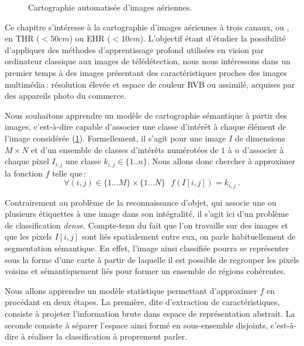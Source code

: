 \begin{figure}[t]
	\resizebox{\textwidth}{!}{}
	\caption{Cartographie automatisée d'images aériennes.}
	\label{fig:semantic_mapping}
\end{figure}

Ce chapitre s'intéresse à la cartographie d'images aériennes à trois canaux,  ou , en \gls{THR} ($<50cm$) ou \gls{EHR} ($<10cm$). L'objectif étant d'étudier la possibilité d'appliquer des méthodes d'apprentissage profond utilisées en vision par ordinateur classique aux images de télédétection, nous nous intéressons dans un premier temps à des images présentant des caractéristiques proches des images multimédia\,: résolution élevée et espace de couleur \gls{RVB} ou assimilé, acquises par des appareils photo du commerce.

Nous souhaitons apprendre un modèle de cartographie sémantique à partir des images, c'est-à-dire capable d'associer une classe d'intérêt à chaque élément de l'image considérée (\cref{fig:semantic_mapping}). Formellement, il s'agit pour une image $I$ de dimensions $M \times N$ et d'un ensemble de classes d'intérêts numérotées de $1$ à $n$ d'associer à chaque pixel $I_{i,j}$ une classe $k_{i,j} \in \{1..n\}$. Nous allons donc chercher à approximer la fonction $f$ telle que\,:
\begin{equation}
	\forall (i,j) \in \{1\dots{}M\}\times\{1\dots{}N\}~~~f(I[i,j]) = k_{i,j}~.
\end{equation}

Contrairement au problème de la reconnaissance d'objet, qui associe une ou plusieurs étiquettes à une image dans son intégralité, il s'agit ici d'un problème de classification \emph{dense}. Compte-tenu du fait que l'on travaille sur des images et que les pixels $I[i,j]$ sont liés spatialement entre eux, on parle habituellement de segmentation sémantique. En effet, l'image ainsi classifiée pourra se représenter sous la forme d'une carte à partir de laquelle il est possible de regrouper les pixels voisins et sémantiquement liés pour former un ensemble de régions cohérentes.

Nous allons apprendre un modèle statistique permettant d'approximer $f$ en procédant en deux étapes. La première, dite d'extraction de caractéristiques, consiste à projeter l'information brute dans espace de représentation abstrait. La seconde consiste à séparer l'espace ainsi formé en sous-ensemble disjoints, c'est-à-dire à réaliser la classification à proprement parler.

